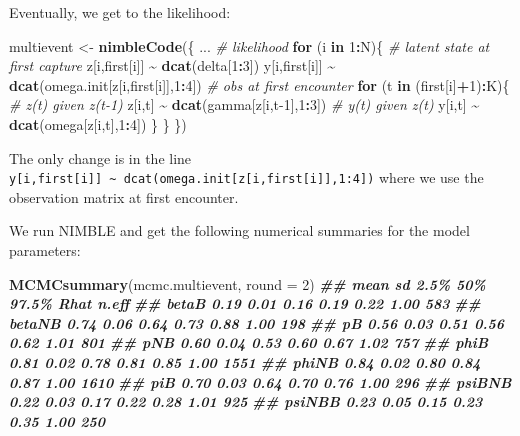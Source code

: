 \documentclass[
  12pt,
]{krantz}
\newenvironment{Shaded}{\begin{snugshade}}{\end{snugshade}}
\newcommand{\AttributeTok}[1]{\textcolor[rgb]{0.13,0.29,0.53}{#1}}
\newcommand{\CommentTok}[1]{\textcolor[rgb]{0.56,0.35,0.01}{\textit{#1}}}
\newcommand{\ControlFlowTok}[1]{\textcolor[rgb]{0.13,0.29,0.53}{\textbf{#1}}}
\newcommand{\DecValTok}[1]{\textcolor[rgb]{0.00,0.00,0.81}{#1}}
\newcommand{\DocumentationTok}[1]{\textcolor[rgb]{0.56,0.35,0.01}{\textbf{\textit{#1}}}}
\newcommand{\FunctionTok}[1]{\textcolor[rgb]{0.13,0.29,0.53}{\textbf{#1}}}
\newcommand{\NormalTok}[1]{#1}
\newcommand{\OtherTok}[1]{\textcolor[rgb]{0.56,0.35,0.01}{#1}}
\newcommand{\SpecialCharTok}[1]{\textcolor[rgb]{0.81,0.36,0.00}{\textbf{#1}}}
\begin{document}
Eventually, we get to the likelihood:

\begin{Shaded}
\begin{Highlighting}[]
\NormalTok{multievent }\OtherTok{\textless{}{-}} \FunctionTok{nimbleCode}\NormalTok{(\{}
\NormalTok{...}
  \CommentTok{\# likelihood}
  \ControlFlowTok{for}\NormalTok{ (i }\ControlFlowTok{in} \DecValTok{1}\SpecialCharTok{:}\NormalTok{N)\{}
    \CommentTok{\# latent state at first capture}
\NormalTok{    z[i,first[i]] }\SpecialCharTok{\textasciitilde{}} \FunctionTok{dcat}\NormalTok{(delta[}\DecValTok{1}\SpecialCharTok{:}\DecValTok{3}\NormalTok{])}
\NormalTok{    y[i,first[i]] }\SpecialCharTok{\textasciitilde{}} \FunctionTok{dcat}\NormalTok{(omega.init[z[i,first[i]],}\DecValTok{1}\SpecialCharTok{:}\DecValTok{4}\NormalTok{]) }\CommentTok{\# obs at first encounter}
    \ControlFlowTok{for}\NormalTok{ (t }\ControlFlowTok{in}\NormalTok{ (first[i]}\SpecialCharTok{+}\DecValTok{1}\NormalTok{)}\SpecialCharTok{:}\NormalTok{K)\{}
      \CommentTok{\# z(t) given z(t{-}1)}
\NormalTok{      z[i,t] }\SpecialCharTok{\textasciitilde{}} \FunctionTok{dcat}\NormalTok{(gamma[z[i,t}\DecValTok{{-}1}\NormalTok{],}\DecValTok{1}\SpecialCharTok{:}\DecValTok{3}\NormalTok{])}
      \CommentTok{\# y(t) given z(t)}
\NormalTok{      y[i,t] }\SpecialCharTok{\textasciitilde{}} \FunctionTok{dcat}\NormalTok{(omega[z[i,t],}\DecValTok{1}\SpecialCharTok{:}\DecValTok{4}\NormalTok{])}
\NormalTok{    \}}
\NormalTok{  \}}
\NormalTok{\})}
\end{Highlighting}
\end{Shaded}

The only change is in the line \texttt{y{[}i,first{[}i{]}{]}\ \textasciitilde{}\ dcat(omega.init{[}z{[}i,first{[}i{]}{]},1:4{]})} where we use the observation matrix at first encounter.

We run NIMBLE and get the following numerical summaries for the model parameters:

\begin{Shaded}
\begin{Highlighting}[]
\FunctionTok{MCMCsummary}\NormalTok{(mcmc.multievent, }\AttributeTok{round =} \DecValTok{2}\NormalTok{)}
\DocumentationTok{\#\#        mean   sd 2.5\%  50\% 97.5\% Rhat n.eff}
\DocumentationTok{\#\# betaB  0.19 0.01 0.16 0.19  0.22 1.00   583}
\DocumentationTok{\#\# betaNB 0.74 0.06 0.64 0.73  0.88 1.00   198}
\DocumentationTok{\#\# pB     0.56 0.03 0.51 0.56  0.62 1.01   801}
\DocumentationTok{\#\# pNB    0.60 0.04 0.53 0.60  0.67 1.02   757}
\DocumentationTok{\#\# phiB   0.81 0.02 0.78 0.81  0.85 1.00  1551}
\DocumentationTok{\#\# phiNB  0.84 0.02 0.80 0.84  0.87 1.00  1610}
\DocumentationTok{\#\# piB    0.70 0.03 0.64 0.70  0.76 1.00   296}
\DocumentationTok{\#\# psiBNB 0.22 0.03 0.17 0.22  0.28 1.01   925}
\DocumentationTok{\#\# psiNBB 0.23 0.05 0.15 0.23  0.35 1.00   250}
\end{Highlighting}
\end{Shaded}
\end{document}
